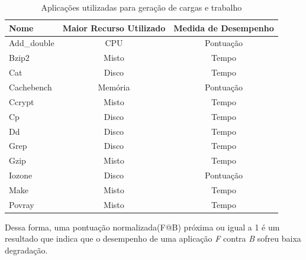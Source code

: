 \begin{table}[!htb]
\centering
\caption{Aplicações utilizadas para geração de cargas e trabalho}
\label{table-aplications}
\begin{tabular}{|l|c|c|}
\hline
Nome        & \multicolumn{1}{l|}{Maior Recurso Utilizado} & \multicolumn{1}{l|}{Medida de Desempenho} \\ \hline
Add\_double & CPU                                          & Pontuação                                  \\ \hline
Bzip2       & Misto                                        & Tempo                                      \\ \hline
Cat         & Disco                                        & Tempo                                      \\ \hline
Cachebench  & Memória                                      & Pontuação                                  \\ \hline
Ccrypt      & Misto                                        & Tempo                                      \\ \hline
Cp          & Disco                                        & Tempo                                      \\ \hline
Dd          & Disco                                        & Tempo                                      \\ \hline
Grep        & Disco                                        & Tempo                                      \\ \hline
Gzip        & Misto                                        & Tempo                                      \\ \hline
Iozone      & Disco                                        & Pontuação                                  \\ \hline
Make        & Misto                                        & Tempo                                      \\ \hline
Povray      & Misto                                        & Tempo                                      \\ \hline
\end{tabular}
\end{table}

Dessa forma, uma pontuação normalizada(F@B) próxima ou igual a 1 é um resultado que indica que o desempenho de uma aplicação \textit{F} contra \textit{B} sofreu baixa degradação.

